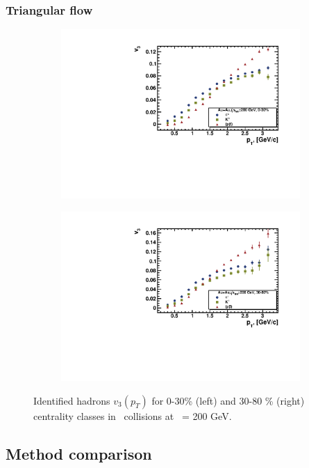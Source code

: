 \FloatBarrier
\subsubsection{Triangular flow}

\begin{figure}[ht]
    \begin{subfigure}{.49\textwidth}
        \centering
        \includegraphics[width=1.\linewidth]{Figures/v3_Total_pt_cent0.pdf}
    \end{subfigure}
    \begin{subfigure}{.49\textwidth}
        \centering
        \includegraphics[width=1.\linewidth]{Figures/v3_Total_pt_cent1.pdf}
    \end{subfigure}
    \label{fig:v3_EP_PID}
    \caption{Identified hadrons $v_3(p_T)$ for 0-30\% (left) and 30-80 \% (right) centrality classes in \AuAu\ collisions at \sNN\ = 200 GeV.}
\end{figure}

\FloatBarrier
\subsection{Method comparison}
